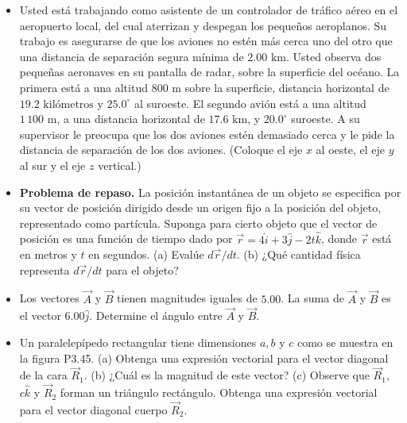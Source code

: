 \documentclass[11pt,a4paper]{article}
\begin{document}
\newpage

\begin{itemize}
    \item[\textbf{42.}] Usted está trabajando como asistente de un controlador de tráfico aéreo en el aeropuerto local, del cual aterrizan y despegan los pequeños aeroplanos. Su trabajo es asegurarse de que los aviones no estén más cerca uno del otro que una distancia de separación segura mínima de $2.00 \text{ km}$. Usted observa dos pequeñas aeronaves en su pantalla de radar, sobre la superficie del océano. La primera está a una altitud $800 \text{ m}$ sobre la superficie, distancia horizontal de $19.2 \text{ kilómetros}$ y $25.0^\circ$ al suroeste. El segundo avión está a una altitud $1\,100 \text{ m}$, a una distancia horizontal de $17.6 \text{ km}$, y $20.0^\circ$ suroeste. A su supervisor le preocupa que los dos aviones estén demasiado cerca y le pide la distancia de separación de los dos aviones. (Coloque el eje $x$ al oeste, el eje $y$ al sur y el eje $z$ vertical.)
    \vspace*{7cm}

    \item[\textbf{43.}] \textbf{Problema de repaso.} La posición instantánea de un objeto se especifica por su vector de posición dirigido desde un origen fijo a la posición del objeto, representado como partícula. Suponga para cierto objeto que el vector de posición es una función de tiempo dado por $\vec{r} = 4\hat{i} + 3\hat{j} - 2t\hat{k}$, donde $\vec{r}$ está en metros y $t$ en segundos. (a) Evalúe $d\vec{r}/dt$. (b) ¿Qué cantidad física representa $d\vec{r}/dt$ para el objeto?
    \vspace*{6cm}

    \item[\textbf{44.}] Los vectores $\vec{A}$ y $\vec{B}$ tienen magnitudes iguales de $5.00$. La suma de $\vec{A}$ y $\vec{B}$ es el vector $6.00\hat{j}$. Determine el ángulo entre $\vec{A}$ y $\vec{B}$.
    \vspace*{6cm}

    \item[\textbf{45.}] Un paralelepípedo rectangular tiene dimensiones $a, b$ y $c$ como se muestra en la figura P3.45. (a) Obtenga una expresión vectorial para el vector diagonal de la cara $\vec{R}_1$. (b) ¿Cuál es la magnitud de este vector? (c) Observe que $\vec{R}_1$, $c\hat{k}$ y $\vec{R}_2$ forman un triángulo rectángulo. Obtenga una expresión vectorial para el vector diagonal cuerpo $\vec{R}_2$.
    \vspace*{6cm}
\end{itemize}
\end{document}
